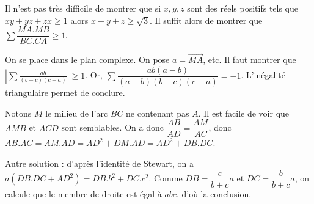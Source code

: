 \begin{sol}
 Il n'est pas tr\`es difficile de montrer que si $x,y,z$ sont des r\'eels positifs tels que $xy+yz+zx\geqslant 1$ alors $x+y+z\geqslant \sqrt{3}$.
Il suffit alors de montrer que $\sum\dfrac{MA.MB}{BC.CA}\geqslant 1$.

On se place dans le plan complexe. On pose $a=\overrightarrow{MA}$, etc. Il faut montrer que $\left|\sum\frac{ab}{(b-c)(c-a)}\right|\geqslant 1$.
Or, $\sum\dfrac{ab(a-b)}{(a-b)(b-c)(c-a)}=-1$. L'in\'egalit\'e triangulaire permet de conclure.
\end{sol}

\begin{sol}
\begin{center}
\end{center}
 Notons $M$ le milieu de l'arc $BC$ ne contenant pas $A$. Il est facile de voir que $AMB$ et $ACD$ sont semblables. On a donc $\dfrac{AB}{AD}=\dfrac{AM}{AC}$, donc
$AB.AC=AM.AD=AD^2+DM.AD=AD^2+DB.DC$.

Autre solution : d'apr\`es l'identit\'e de Stewart, on a $a(DB.DC+AD^2)=DB.b^2+DC.c^2$. Comme $DB=\dfrac{c}{b+c}a$ et $DC=\dfrac{b}{b+c}a$, on calcule que le membre
de droite est \'egal \`a $abc$, d'o\`u la conclusion.
\end{sol}


